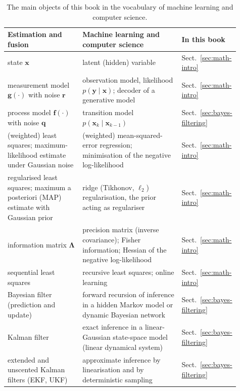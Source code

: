 \begin{table}[!t]
    \centering
    \footnotesize
    \setlength{\tabcolsep}{4pt}
    \renewcommand{\arraystretch}{1.3}
    \caption{The main objects of this book in the vocabulary of machine learning and computer science.}
    \label{tab:ml-dictionary}
    \begin{tabular}{>{\raggedright\arraybackslash}p{0.33\linewidth} >{\raggedright\arraybackslash}p{0.44\linewidth} >{\raggedright\arraybackslash}p{0.14\linewidth}}
        \hline
        \textbf{Estimation and fusion} & \textbf{Machine learning and computer science} & \textbf{In this book} \\
        \hline
        state $\mathbf{x}$ & latent (hidden) variable & Sect.~\ref{sec:math-intro} \\
        measurement model $\mathbf{g}(\cdot)$ with noise $\mathbf{r}$ & observation model, likelihood $p(\mathbf{y}\mid\mathbf{x})$; decoder of a generative model & Sect.~\ref{sec:math-intro} \\
        process model $\mathbf{f}(\cdot)$ with noise $\mathbf{q}$ & transition model $p(\mathbf{x}_k\mid\mathbf{x}_{k-1})$ & Sect.~\ref{sec:bayes-filtering} \\
        (weighted) least squares; maximum-likelihood estimate under Gaussian noise & (weighted) mean-squared-error regression; minimisation of the negative log-likelihood & Sect.~\ref{sec:math-intro} \\
        regularised least squares; maximum a posteriori (MAP) estimate with Gaussian prior & ridge (Tikhonov, $\ell_2$) regularisation, the prior acting as regulariser & Sect.~\ref{sec:math-intro} \\
        information matrix $\mathbf{\Lambda}$ & precision matrix (inverse covariance); Fisher information; Hessian of the negative log-likelihood & Sect.~\ref{sec:math-intro} \\
        sequential least squares & recursive least squares; online learning & Sect.~\ref{sec:math-intro} \\
        Bayesian filter (prediction and update) & forward recursion of inference in a hidden Markov model or dynamic Bayesian network & Sect.~\ref{sec:bayes-filtering} \\
        Kalman filter & exact inference in a linear-Gaussian state-space model (linear dynamical system) & Sect.~\ref{sec:bayes-filtering} \\
       extended and unscented Kalman filters (EKF, UKF) & approximate inference by linearisation and by deterministic sampling & Sect.~\ref{sec:bayes-filtering} \\

\end{tabular}
\end{table}
